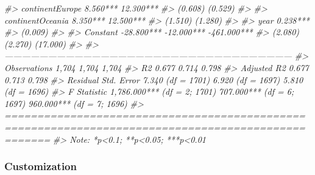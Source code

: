 \documentclass[
]{book}
\newenvironment{Shaded}{\begin{snugshade}}{\end{snugshade}}
\newcommand{\CommentTok}[1]{\textcolor[rgb]{0.56,0.35,0.01}{\textit{#1}}}
\begin{document}
\begin{Shaded}
\begin{Highlighting}[]
\CommentTok{#> continentEurope                                         8.560***                  12.300***        }
\CommentTok{#>                                                          (0.608)                   (0.529)         }
\CommentTok{#>                                                                                                    }
\CommentTok{#> continentOceania                                        8.350***                  12.500***        }
\CommentTok{#>                                                          (1.510)                   (1.280)         }
\CommentTok{#>                                                                                                    }
\CommentTok{#> year                                                                              0.238***         }
\CommentTok{#>                                                                                    (0.009)         }
\CommentTok{#>                                                                                                    }
\CommentTok{#> Constant                    -28.800***                 -12.000***                -461.000***       }
\CommentTok{#>                               (2.080)                    (2.270)                  (17.000)         }
\CommentTok{#>                                                                                                    }
\CommentTok{#> ---------------------------------------------------------------------------------------------------}
\CommentTok{#> Observations                   1,704                      1,704                     1,704          }
\CommentTok{#> R2                             0.677                      0.714                     0.798          }
\CommentTok{#> Adjusted R2                    0.677                      0.713                     0.798          }
\CommentTok{#> Residual Std. Error      7.340 (df = 1701)          6.920 (df = 1697)         5.810 (df = 1696)    }
\CommentTok{#> F Statistic         1,786.000*** (df = 2; 1701) 707.000*** (df = 6; 1697) 960.000*** (df = 7; 1696)}
\CommentTok{#> ===================================================================================================}
\CommentTok{#> Note:                                                                   *p<0.1; **p<0.05; ***p<0.01}
\end{Highlighting}
\end{Shaded}

\hypertarget{customization}{%
\subsubsection*{Customization}\label{customization}}
\end{document}
